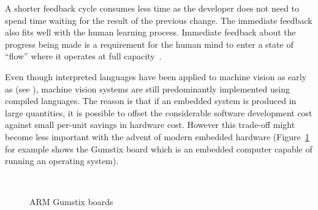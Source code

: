 \documentclass[12pt,a4paper,oneside,openright]{book}
\newcommand{\fig}[1]{Figure~\ref{fig:#1}}
\begin{document}
\begin{CJK}{UTF8}{}
A shorter feedback cycle consumes less time as the developer does not need to spend time waiting for the result of the previous change. The immediate feedback also fits well with the human learning process. Immediate feedback about the progress being made is a requirement for the human mind to enter a state of ``flow'' where it operates at full capacity~\citep{nakamura2002concept,lister1987peopleware}.

Even though interpreted languages have been applied to machine vision as early as \citeyear{mundy} (see \citet{mundy}), machine vision systems are still predominantly implemented using compiled languages.
The reason is that if an embedded system is produced in large quantities, it is possible to offset the considerable software development cost against small per-unit savings in hardware cost. However this trade-off might become less important with the advent of modern embedded hardware (\fig{arm} for example shows the Gumstix board which is an embedded computer capable of running an operating system).
\begin{figure}[htbp]
   \begin{center}
     \\
     \caption{ARM Gumstix boards\label{fig:arm}}
   \end{center}
\end{figure}


\end{CJK}
\end{document}
